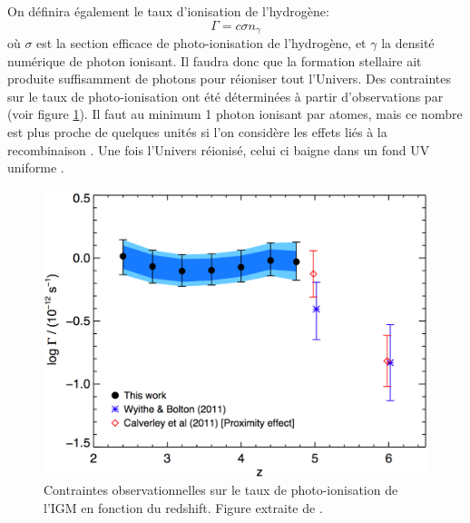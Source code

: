On définira également le taux d'ionisation de l'hydrogène:
\begin{equation}
\Gamma = c \sigma n_\gamma
\end{equation}
où $\sigma$ est la section efficace de photo-ionisation de l'hydrogène, et $\gamma$ la densité numérique de photon ionisant.
Il faudra donc que la formation stellaire ait produite suffisamment de photons pour réioniser tout l'Univers.
Des contraintes sur le taux de photo-ionisation ont été déterminées à partir d'observations par \cite{2013MNRAS.436.1023B} (voir figure \ref{fig:photoionisationrate}).
Il faut au minimum 1 photon ionisant par atomes, mais ce nombre est plus proche de quelques unités si l'on considère les effets liés à la recombinaison \citep{aubert_reionization_2010}.
Une fois l'Univers réionisé, celui ci baigne dans un fond UV uniforme \citep{haardt_radiative_2012}.


\begin{figure}
        \includegraphics[width=.95\linewidth]{img/01/photon_obs.pdf} 
        \caption[Taux de photo-ionisation ]{Contraintes observationnelles sur le taux de photo-ionisation de l'\ac{IGM} en fonction du redshift. 
        Figure extraite de \cite{2013MNRAS.436.1023B}.
 		\label{fig:photoionisationrate}}
\end{figure}



\clearpage


